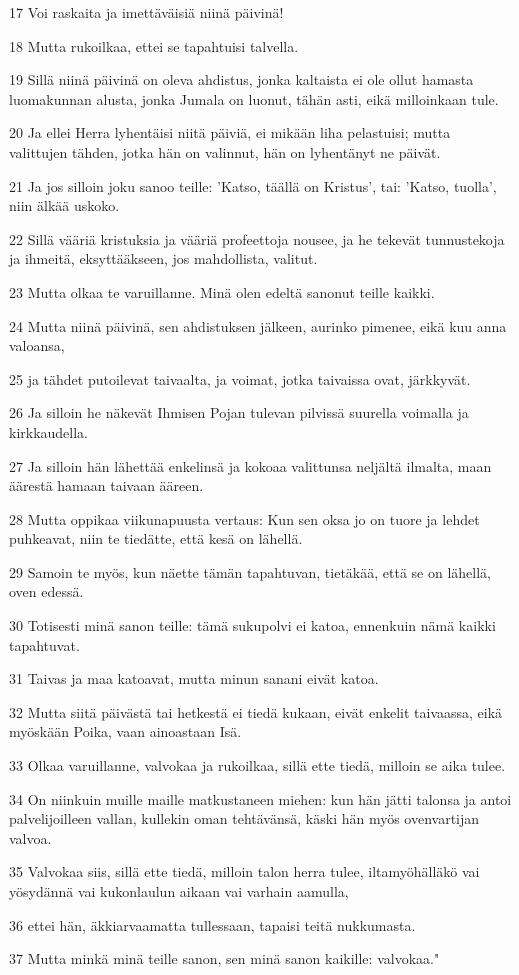 \par 17 Voi raskaita ja imettäväisiä niinä päivinä!
\par 18 Mutta rukoilkaa, ettei se tapahtuisi talvella.
\par 19 Sillä niinä päivinä on oleva ahdistus, jonka kaltaista ei ole ollut hamasta luomakunnan alusta, jonka Jumala on luonut, tähän asti, eikä milloinkaan tule.
\par 20 Ja ellei Herra lyhentäisi niitä päiviä, ei mikään liha pelastuisi; mutta valittujen tähden, jotka hän on valinnut, hän on lyhentänyt ne päivät.
\par 21 Ja jos silloin joku sanoo teille: 'Katso, täällä on Kristus', tai: 'Katso, tuolla', niin älkää uskoko.
\par 22 Sillä vääriä kristuksia ja vääriä profeettoja nousee, ja he tekevät tunnustekoja ja ihmeitä, eksyttääkseen, jos mahdollista, valitut.
\par 23 Mutta olkaa te varuillanne. Minä olen edeltä sanonut teille kaikki.
\par 24 Mutta niinä päivinä, sen ahdistuksen jälkeen, aurinko pimenee, eikä kuu anna valoansa,
\par 25 ja tähdet putoilevat taivaalta, ja voimat, jotka taivaissa ovat, järkkyvät.
\par 26 Ja silloin he näkevät Ihmisen Pojan tulevan pilvissä suurella voimalla ja kirkkaudella.
\par 27 Ja silloin hän lähettää enkelinsä ja kokoaa valittunsa neljältä ilmalta, maan äärestä hamaan taivaan ääreen.
\par 28 Mutta oppikaa viikunapuusta vertaus: Kun sen oksa jo on tuore ja lehdet puhkeavat, niin te tiedätte, että kesä on lähellä.
\par 29 Samoin te myös, kun näette tämän tapahtuvan, tietäkää, että se on lähellä, oven edessä.
\par 30 Totisesti minä sanon teille: tämä sukupolvi ei katoa, ennenkuin nämä kaikki tapahtuvat.
\par 31 Taivas ja maa katoavat, mutta minun sanani eivät katoa.
\par 32 Mutta siitä päivästä tai hetkestä ei tiedä kukaan, eivät enkelit taivaassa, eikä myöskään Poika, vaan ainoastaan Isä.
\par 33 Olkaa varuillanne, valvokaa ja rukoilkaa, sillä ette tiedä, milloin se aika tulee.
\par 34 On niinkuin muille maille matkustaneen miehen: kun hän jätti talonsa ja antoi palvelijoilleen vallan, kullekin oman tehtävänsä, käski hän myös ovenvartijan valvoa.
\par 35 Valvokaa siis, sillä ette tiedä, milloin talon herra tulee, iltamyöhälläkö vai yösydännä vai kukonlaulun aikaan vai varhain aamulla,
\par 36 ettei hän, äkkiarvaamatta tullessaan, tapaisi teitä nukkumasta.
\par 37 Mutta minkä minä teille sanon, sen minä sanon kaikille: valvokaa."

